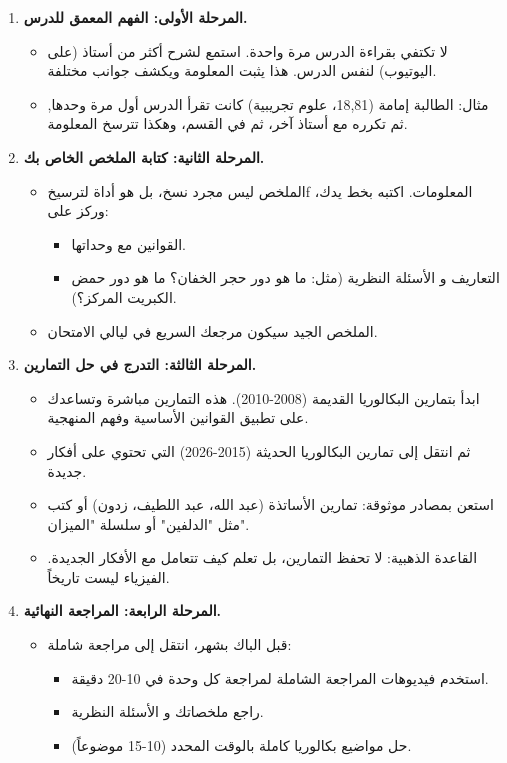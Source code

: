 \documentclass[12pt,a4paper]{book}
\begin{document}
	\begin{enumerate}
		\item \textbf{المرحلة الأولى: الفهم المعمق للدرس.}
		\begin{itemize}
			\item لا تكتفي بقراءة الدرس مرة واحدة. استمع لشرح أكثر من أستاذ (على اليوتيوب) لنفس الدرس. هذا يثبت المعلومة ويكشف جوانب مختلفة.
			\item مثال: الطالبة إمامة (18,81، علوم تجريبية) كانت تقرأ الدرس أول مرة وحدها, ثم تكرره مع أستاذ آخر، ثم في القسم، وهكذا تترسخ المعلومة.
		\end{itemize}
		\item \textbf{المرحلة الثانية: كتابة الملخص الخاص بك.}
		\begin{itemize}
			\item الملخص ليس مجرد نسخ، بل هو أداة لترسيخf المعلومات. اكتبه بخط يدك، وركز على:
			\begin{itemize}
				\item القوانين مع وحداتها.
				\item التعاريف و الأسئلة النظرية (مثل: ما هو دور حجر الخفان؟ ما هو دور حمض الكبريت المركز؟).

			\end{itemize}
			\item الملخص الجيد سيكون مرجعك السريع في ليالي الامتحان.
		\end{itemize}
		\item \textbf{المرحلة الثالثة: التدرج في حل التمارين.}
		\begin{itemize}
			\item ابدأ بتمارين البكالوريا القديمة (2008-2010). هذه التمارين مباشرة وتساعدك على تطبيق القوانين الأساسية وفهم المنهجية.
			\item ثم انتقل إلى تمارين البكالوريا الحديثة (2015-2026) التي تحتوي على أفكار جديدة.
			\item استعن بمصادر موثوقة: تمارين الأساتذة (عبد الله، عبد اللطيف، زدون) أو كتب مثل "الدلفين" أو سلسلة "الميزان".
			\item القاعدة الذهبية: لا تحفظ التمارين، بل تعلم كيف تتعامل مع الأفكار الجديدة. الفيزياء ليست تاريخاً.
		\end{itemize}
		\item \textbf{المرحلة الرابعة: المراجعة النهائية.}
		\begin{itemize}
			\item قبل الباك بشهر، انتقل إلى مراجعة شاملة:
			\begin{itemize}
				\item استخدم فيديوهات المراجعة الشاملة لمراجعة كل وحدة في 10-20 دقيقة.
				\item راجع ملخصاتك و الأسئلة النظرية.
				\item حل مواضيع بكالوريا كاملة بالوقت المحدد (10-15 موضوعاً).
			\end{itemize}
		\end{itemize}
	\end{enumerate}
	
\end{document}
